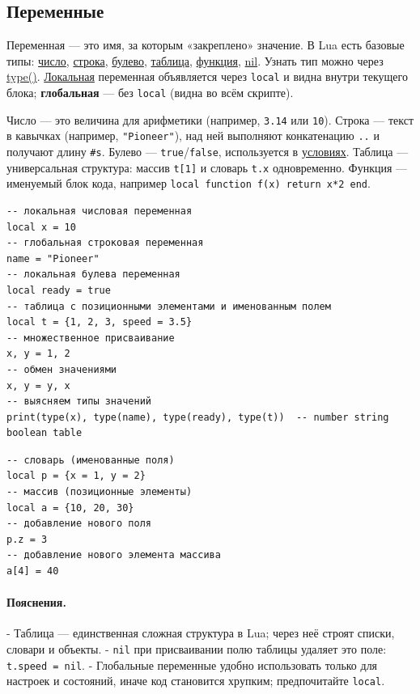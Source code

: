 \subsection{Переменные}
Переменная — это имя, за которым «закреплено» значение. В Lua есть базовые типы: \hyperlink{term:number}{число}, \hyperlink{term:string}{строка}, \hyperlink{term:boolean}{булево}, \hyperlink{term:table}{таблица}, \hyperlink{term:function}{функция}, \hyperlink{term:nil}{nil}. Узнать тип можно через \hyperlink{term:type}{type()}. \hyperlink{term:scope}{Локальная} переменная объявляется через \verb|local| и видна внутри текущего блока; \textbf{глобальная} — без \verb|local| (видна во всём скрипте).

Число — это величина для арифметики (например, \verb|3.14| или \verb|10|). Строка — текст в кавычках (например, \verb|"Pioneer"|), над ней выполняют конкатенацию \verb|..| и получают длину \verb|#s|. Булево — \verb|true|/\verb|false|, используется в \hyperlink{term:condition}{условиях}. Таблица — универсальная структура: массив \verb|t[1]| и словарь \verb|t.x| одновременно. Функция — именуемый блок кода, например \verb|local function f(x) return x*2 end|.

\begin{verbatim}
-- локальная числовая переменная
local x = 10
-- глобальная строковая переменная
name = "Pioneer"
-- локальная булева переменная
local ready = true
-- таблица с позиционными элементами и именованным полем
local t = {1, 2, 3, speed = 3.5}
-- множественное присваивание
x, y = 1, 2
-- обмен значениями
x, y = y, x
-- выясняем типы значений
print(type(x), type(name), type(ready), type(t))  -- number string boolean table
\end{verbatim}
\begin{verbatim}
-- словарь (именованные поля)
local p = {x = 1, y = 2}
-- массив (позиционные элементы)
local a = {10, 20, 30}
-- добавление нового поля
p.z = 3
-- добавление нового элемента массива
a[4] = 40
\end{verbatim}
\paragraph{Пояснения.}
- Таблица — единственная сложная структура в Lua; через неё строят списки, словари и объекты.
- \verb|nil| при присваивании полю таблицы удаляет это поле: \verb|t.speed = nil|.
- Глобальные переменные удобно использовать только для настроек и состояний, иначе код становится хрупким; предпочитайте \verb|local|.

